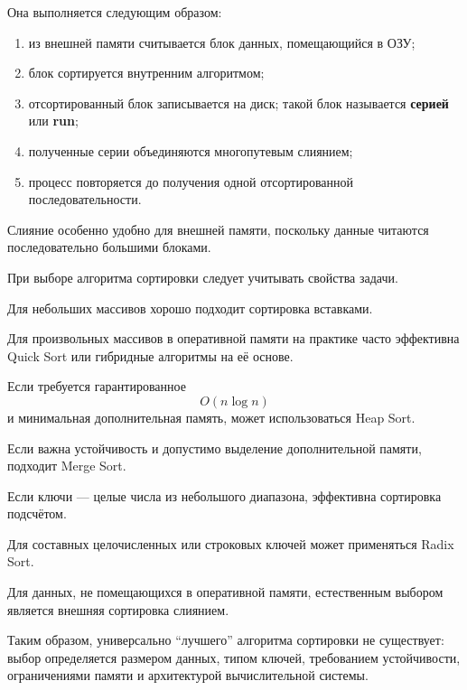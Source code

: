 Она выполняется следующим образом:

\begin{enumerate}
	\item из внешней памяти считывается блок данных, помещающийся в ОЗУ;
	\item блок сортируется внутренним алгоритмом;
	\item отсортированный блок записывается на диск; такой блок называется
	\textbf{серией} или \textbf{run};
	\item полученные серии объединяются многопутевым слиянием;
	\item процесс повторяется до получения одной отсортированной
	последовательности.
\end{enumerate}

Слияние особенно удобно для внешней памяти, поскольку данные читаются
последовательно большими блоками.

При выборе алгоритма сортировки следует учитывать свойства задачи.

Для небольших массивов хорошо подходит сортировка вставками.

Для произвольных массивов в оперативной памяти на практике часто
эффективна Quick Sort или гибридные алгоритмы на её основе.

Если требуется гарантированное
\[
O(n\log n)
\]
и минимальная дополнительная память, может использоваться Heap Sort.

Если важна устойчивость и допустимо выделение дополнительной памяти,
подходит Merge Sort.

Если ключи --- целые числа из небольшого диапазона, эффективна сортировка
подсчётом.

Для составных целочисленных или строковых ключей может применяться
Radix Sort.

Для данных, не помещающихся в оперативной памяти, естественным выбором
является внешняя сортировка слиянием.

Таким образом, универсально ``лучшего'' алгоритма сортировки не существует:
выбор определяется размером данных, типом ключей, требованием устойчивости,
ограничениями памяти и архитектурой вычислительной системы.

\newpage